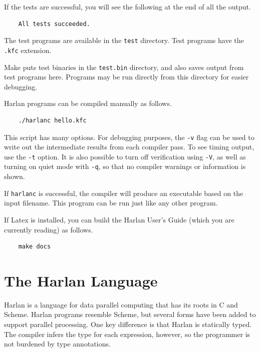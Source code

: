 \documentclass[oneside]{report}
\begin{document}
If the tests are successful, you will see the following at the end of
all the output.

\begin{verbatim}
    All tests succeeded.
\end{verbatim}

The test programs are available in the \texttt{test} directory. Test
programs have the \texttt{.kfc} extension.

Make puts test binaries in the \texttt{test.bin} directory, and also
saves output from test programs here. Programs may be run directly
from this directory for easier debugging.

Harlan programs can be compiled manually as follows.

\begin{verbatim}
    ./harlanc hello.kfc
\end{verbatim}

This script has many options.  For debugging purposes, the \texttt{-v}
flag can be used to write out the intermediate results from each
compiler pass.  To see timing output, use the \texttt{-t} option.  It
is also possible to turn off verification using \texttt{-V}, as well
as turning on quiet mode with \texttt{-q}, so that no compiler
warnings or information is shown.

If \texttt{harlanc} is successful, the compiler will produce an
executable based on the input filename. This program can be run just
like any other program.

If Latex is installed, you can build the Harlan User's Guide (which
you are currently reading) as follows.

\begin{verbatim}
    make docs
\end{verbatim}



\chapter{The Harlan Language}

Harlan is a language for data parallel computing that has its roots in
C and Scheme. Harlan programs resemble Scheme, but several forms have
been added to support parallel processing. One key difference is that
Harlan is statically typed. The compiler infers the type for each
expression, however, so the programmer is not burdened by type
annotations.
\end{document}
